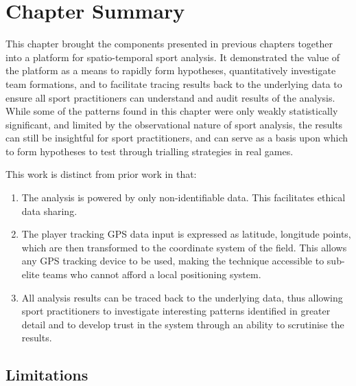 
\section{Chapter Summary}

This chapter brought the components presented in previous chapters together into a platform for spatio-temporal sport analysis. It demonstrated the value of the platform as a means to rapidly form hypotheses, quantitatively investigate team formations, and to facilitate tracing results back to the underlying data to ensure all sport practitioners can understand and audit results of the analysis. While some of the patterns found in this chapter were only weakly statistically significant, and limited by the observational nature of sport analysis, the results can still be insightful for sport practitioners, and can serve as a basis upon which to form hypotheses to test through trialling strategies in real games.


\pagebreak{}

This work is distinct from prior work in that:

\begin{enumerate}
   \item The analysis is powered by only non-identifiable data. This facilitates ethical data sharing.
   \item The player tracking GPS data input is expressed as latitude, longitude points, which are then transformed to the coordinate system of the field. This allows any GPS tracking device to be used, making the technique accessible to sub-elite teams who cannot afford a local positioning system.
   \item All analysis results can be traced back to the underlying data, thus allowing sport practitioners to investigate interesting patterns identified in greater detail and to develop trust in the system through an ability to scrutinise the results.
\end{enumerate}

\subsection*{Limitations}

